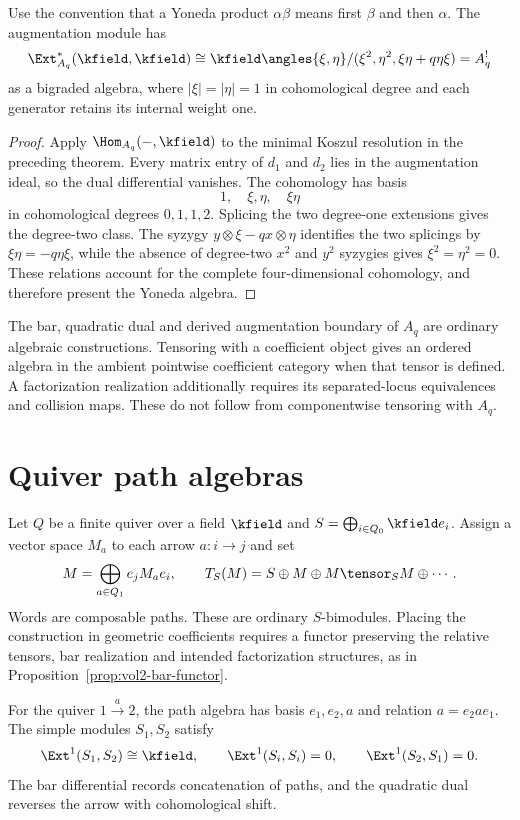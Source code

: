 \begin{theorem}
Use the convention that a Yoneda product $\alpha\beta$ means first $\beta$ and then $\alpha$. The augmentation module has
\[
 \Ext^*_{A_q}(\kfield,\kfield)
 \cong
 \kfield\angles{\xi,\eta}/(\xi^2,\eta^2,\xi\eta+q\eta\xi)
 =A_q^!
\]
as a bigraded algebra, where $|\xi|=|\eta|=1$ in cohomological degree and each generator retains its internal weight one.
\end{theorem}
\begin{proof}
Apply $\Hom_{A_q}(-,\kfield)$ to the minimal Koszul resolution in the preceding theorem. Every matrix entry of $d_1$ and $d_2$ lies in the augmentation ideal, so the dual differential vanishes. The cohomology has basis
\[
 1,\quad \xi,\eta,\quad \xi\eta
\]
in cohomological degrees $0,1,1,2$. Splicing the two degree-one extensions gives the degree-two class. The syzygy $y\otimes\xi-qx\otimes\eta$ identifies the two splicings by
$\xi\eta=-q\eta\xi$, while the absence of degree-two $x^2$ and $y^2$ syzygies gives $\xi^2=\eta^2=0$. These relations account for the complete four-dimensional cohomology, and therefore present the Yoneda algebra.
\end{proof}

The bar, quadratic dual and derived augmentation boundary of $A_q$ are
ordinary algebraic constructions.
Tensoring with a coefficient object gives an ordered algebra in the
ambient pointwise coefficient category when that tensor is defined.
A factorization realization additionally requires its separated-locus
equivalences and collision maps. These do not follow from componentwise
tensoring with $A_q$.

\chapter{Quiver path algebras}
Let $Q$ be a finite quiver over a field $\kfield$ and
$S=\bigoplus_{i\in Q_0}\kfield e_i$.
Assign a vector space $M_a$ to each arrow $a:i\to j$ and set
\[
 M=\bigoplus_{a\in Q_1}e_jM_ae_i,
 \qquad
 T_S(M)=S\oplus M\oplus M\tensor_S M\oplus\cdots.
\]
Words are composable paths. These are ordinary $S$-bimodules.
Placing the construction in geometric coefficients requires a functor
preserving the relative tensors, bar realization and intended
factorization structures, as in Proposition~\ref{prop:vol2-bar-functor}.

For the quiver $1\xrightarrow{a}2$, the path algebra has basis $e_1,e_2,a$ and relation $a=e_2ae_1$. The simple modules $S_1,S_2$ satisfy
\[
 \Ext^1(S_1,S_2)\cong\kfield,
 \qquad
 \Ext^1(S_i,S_i)=0,
 \qquad
 \Ext^1(S_2,S_1)=0.
\]
The bar differential records concatenation of paths, and the quadratic dual reverses the arrow with cohomological shift.

